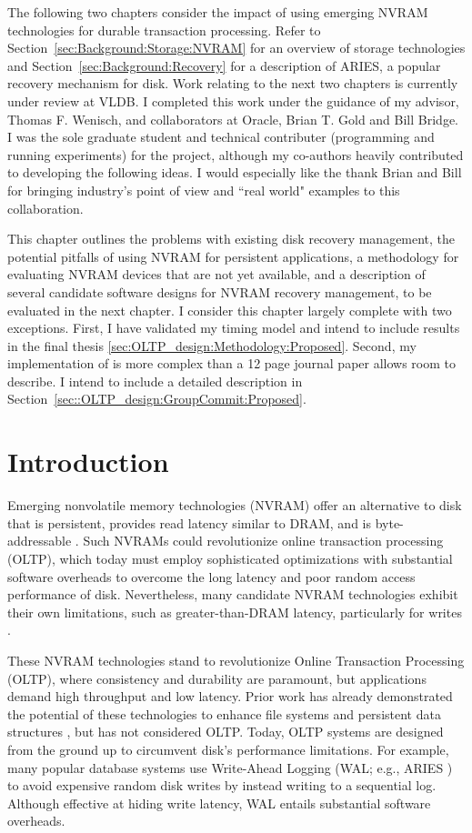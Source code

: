 The following two chapters consider the impact of using emerging NVRAM technologies for durable transaction processing.
Refer to Section~\ref{sec:Background:Storage:NVRAM} for an overview of storage technologies and Section~\ref{sec:Background:Recovery} for a description of ARIES, a popular recovery mechanism for disk.
Work relating to the next two chapters is currently under review at VLDB.
I completed this work under the guidance of my advisor, Thomas F. Wenisch, and collaborators at Oracle, Brian T. Gold and Bill Bridge.
I was the sole graduate student and technical contributer (programming and running experiments) for the project, although my co-authors heavily contributed to developing the following ideas.
I would especially like the thank Brian and Bill for bringing industry's point of view and ``real world" examples to this collaboration.

This chapter outlines the problems with existing disk recovery management, the potential pitfalls of using NVRAM for persistent applications, a methodology for evaluating NVRAM devices that are not yet available, and a description of several candidate software designs for NVRAM recovery management, to be evaluated in the next chapter.
I consider this chapter largely complete with two exceptions.
First, I have validated my timing model and intend to include results in the final thesis \ref{sec:OLTP_design:Methodology:Proposed}.
Second, my implementation of \GroupCommit is more complex than a 12 page journal paper allows room to describe.
I intend to include a detailed description in Section~\ref{sec::OLTP_design:GroupCommit:Proposed}.

\section{Introduction}
\label{sec:OLTP_design:Intro}

Emerging nonvolatile memory technologies (NVRAM) offer an alternative to disk that is persistent, provides read latency similar to DRAM, and is byte-addressable \cite{BurrKurdi08}.
Such NVRAMs could revolutionize online transaction processing (OLTP), which today must employ sophisticated optimizations with substantial software overheads to overcome the long latency and poor random access performance of disk.
Nevertheless, many candidate NVRAM technologies exhibit their own limitations, such as greater-than-DRAM latency, particularly for writes \cite{LeeIpek09}.

These NVRAM technologies stand to revolutionize Online Transaction Processing (OLTP), where consistency and durability are paramount, but applications demand high throughput and low latency.
Prior work has already demonstrated the potential of these technologies to enhance file systems \cite{ConditNightingale09} and persistent data structures \cite{VenkataramanTolia11}, but has not considered OLTP.
Today, OLTP systems are designed from the ground up to circumvent disk's performance limitations.
For example, many popular database systems use Write-Ahead Logging (WAL; e.g., ARIES \cite{MohanHaderle92}) to avoid expensive random disk writes by instead writing to a sequential log.  
Although effective at hiding write latency, WAL entails substantial software overheads.

